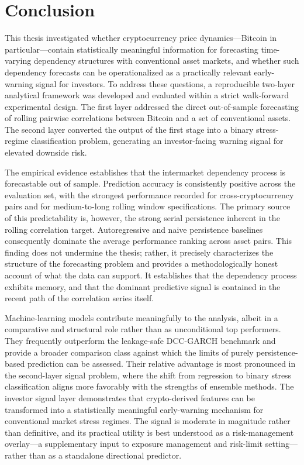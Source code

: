 \section{Conclusion}

This thesis investigated whether cryptocurrency price dynamics---Bitcoin in particular---contain statistically meaningful information for forecasting time-varying dependency structures with conventional asset markets, and whether such dependency forecasts can be operationalized as a practically relevant early-warning signal for investors. To address these questions, a reproducible two-layer analytical framework was developed and evaluated within a strict walk-forward experimental design. The first layer addressed the direct out-of-sample forecasting of rolling pairwise correlations between Bitcoin and a set of conventional assets. The second layer converted the output of the first stage into a binary stress-regime classification problem, generating an investor-facing warning signal for elevated downside risk.

The empirical evidence establishes that the intermarket dependency process is forecastable out of sample. Prediction accuracy is consistently positive across the evaluation set, with the strongest performance recorded for cross-cryptocurrency pairs and for medium-to-long rolling window specifications. The primary source of this predictability is, however, the strong serial persistence inherent in the rolling correlation target. Autoregressive and naive persistence baselines consequently dominate the average performance ranking across asset pairs. This finding does not undermine the thesis; rather, it precisely characterizes the structure of the forecasting problem and provides a methodologically honest account of what the data can support. It establishes that the dependency process exhibits memory, and that the dominant predictive signal is contained in the recent path of the correlation series itself.

Machine-learning models contribute meaningfully to the analysis, albeit in a comparative and structural role rather than as unconditional top performers. They frequently outperform the leakage-safe DCC-GARCH benchmark and provide a broader comparison class against which the limits of purely persistence-based prediction can be assessed. Their relative advantage is most pronounced in the second-layer signal problem, where the shift from regression to binary stress classification aligns more favorably with the strengths of ensemble methods. The investor signal layer demonstrates that crypto-derived features can be transformed into a statistically meaningful early-warning mechanism for conventional market stress regimes. The signal is moderate in magnitude rather than definitive, and its practical utility is best understood as a risk-management overlay---a supplementary input to exposure management and risk-limit setting---rather than as a standalone directional predictor.

